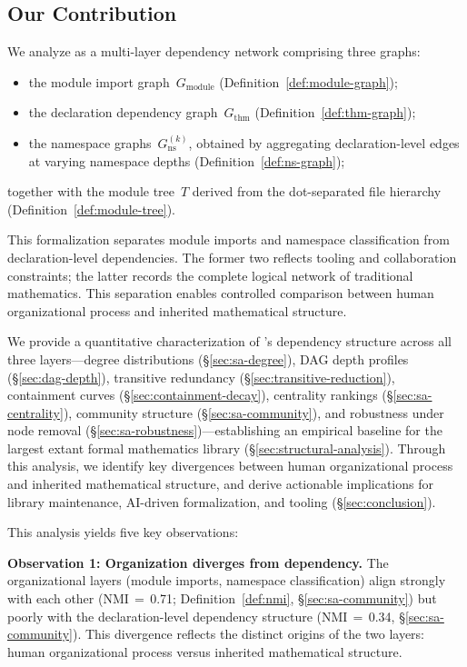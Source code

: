 \subsection{Our Contribution}
\label{sec:contribution}
We analyze  as a multi-layer dependency network comprising three graphs:
\begin{itemize}
    \item the module import graph~$G_{\mathrm{module}}$ (Definition~\ref{def:module-graph});
    \item the declaration dependency graph~$G_{\mathrm{thm}}$ (Definition~\ref{def:thm-graph});
    \item the namespace graphs~$G_{\mathrm{ns}}^{(k)}$, obtained by aggregating declaration-level edges at varying namespace depths (Definition~\ref{def:ns-graph});
\end{itemize}
together with the module tree~$T$ derived from the dot-separated file hierarchy (Definition~\ref{def:module-tree}). 

This formalization separates module imports and namespace classification from declaration-level dependencies. The former two reflects tooling and collaboration constraints; the latter records the complete logical network of traditional mathematics. This separation enables controlled comparison between human organizational process and inherited mathematical structure.

We provide a quantitative characterization of 's dependency structure across all three layers---degree distributions (\S\ref{sec:sa-degree}), DAG depth profiles (\S\ref{sec:dag-depth}), transitive redundancy (\S\ref{sec:transitive-reduction}), containment curves (\S\ref{sec:containment-decay}), centrality rankings (\S\ref{sec:sa-centrality}), community structure (\S\ref{sec:sa-community}), and robustness under node removal (\S\ref{sec:sa-robustness})---establishing an empirical baseline for the largest extant formal mathematics library (\S\ref{sec:structural-analysis}). Through this analysis, we identify key divergences between human organizational process and inherited mathematical structure, and derive actionable implications for library maintenance, AI-driven formalization, and tooling (\S\ref{sec:conclusion}).

This analysis yields five key observations:
\begin{finding}
    \textbf{Observation 1: Organization diverges from dependency.}
    The organizational layers (module imports, namespace classification) align strongly with each other (NMI\,$=$\,0.71; Definition~\ref{def:nmi}, \S\ref{sec:sa-community}) but poorly with the declaration-level dependency structure (NMI\,$=$\,0.34, \S\ref{sec:sa-community}). This divergence reflects the distinct origins of the two layers: human organizational process versus inherited mathematical structure.
\end{finding}

